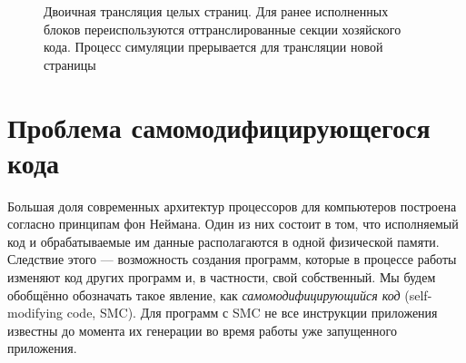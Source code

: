 \begin{figure}[htb]
    \centering
    \caption[Двоичная трансляция целых страниц]{Двоичная трансляция целых страниц. Для ранее исполненных блоков переиспользуются оттранслированные секции хозяйского кода. Процесс симуляции прерывается для трансляции новой страницы}
    \label{fig:bt-pages}
\end{figure}

% 

\section{Проблема самомодифицирующегося кода}\label{sec:smc}

Большая доля современных архитектур процессоров для компьютеров построена согласно принципам фон Неймана. Один из них состоит в том, что исполняемый код и обрабатываемые им данные располагаются в одной физической памяти. Следствие этого --- возможность создания программ, которые в процессе работы изменяют код других программ и, в частности, свой собственный. Мы будем обобщённо обозначать такое явление, как \textit{самомодифицирующийся код} (\abbr self-modifying code, SMC). Для программ с SMC не все инструкции приложения известны до момента их генерации во время работы уже запущенного приложения.

